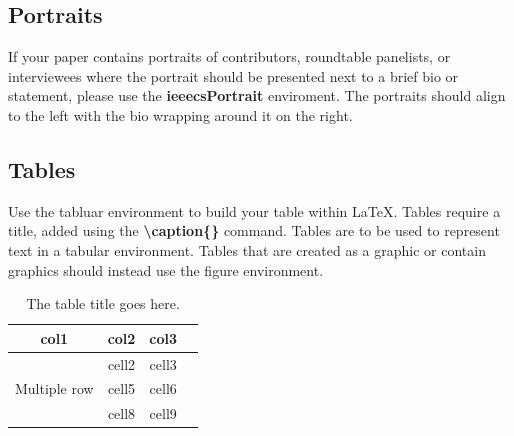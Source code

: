 \documentclass[hasAbstract,authorBox]{csmagazine}
\begin{document}

\subsection{Portraits}

If your paper contains portraits of contributors, roundtable panelists, or interviewees where the portrait should be presented next to a brief bio or statement, please use the \textbf{ieeecsPortrait} enviroment. The portraits should align to the left with the bio wrapping around it on the right.


\vspace{7em}


\subsection{Tables}

Use the tabluar environment to build your table within \LaTeX. Tables require a title, added using the \textbf{\textbackslash{}caption\{\}} command. Tables are to be used to represent text in a tabular environment. Tables that are created as a graphic or contain graphics should instead use the figure environment.



\begin{table}[H]
	\begin{center}
		\caption{The table title goes here.\label{tab:example_tab}}
		\begin{tabular}{ |c|c|c|c| } 
			\hline
			col1 & col2 & col3 \\
			\hline
			\multirow{3}{4em}{Multiple row} & cell2 & cell3 \\ 
			& cell5 & cell6 \\ 
			& cell8 & cell9 \\ 
			\hline
		\end{tabular}
	\end{center}
\end{table}
\end{document}
